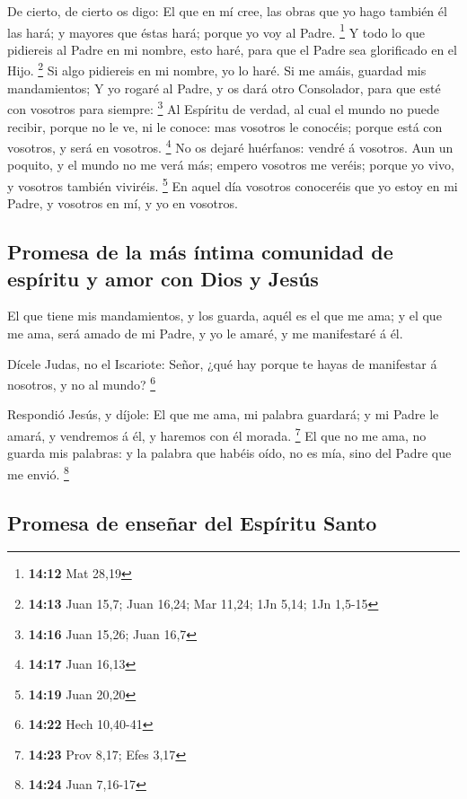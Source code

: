  De cierto, de cierto os digo: El que en mí cree, las obras
que yo hago también él las hará; y mayores que éstas hará; porque yo voy
al Padre. \footnote{\textbf{14:12} Mat 28,19}  Y todo lo
que pidiereis al Padre en mi nombre, esto haré, para que el Padre sea
glorificado en el Hijo. \footnote{\textbf{14:13} Juan 15,7; Juan 16,24;
  Mar 11,24; 1Jn 5,14; 1Jn 1,5-15}  Si algo pidiereis en mi
nombre, yo lo haré.  Si me amáis, guardad mis mandamientos;
 Y yo rogaré al Padre, y os dará otro Consolador, para que
esté con vosotros para siempre: \footnote{\textbf{14:16} Juan 15,26;
  Juan 16,7}  Al Espíritu de verdad, al cual el mundo no
puede recibir, porque no le ve, ni le conoce: mas vosotros le conocéis;
porque está con vosotros, y será en vosotros. \footnote{\textbf{14:17}
  Juan 16,13}  No os dejaré huérfanos: vendré á vosotros.
 Aun un poquito, y el mundo no me verá más; empero vosotros
me veréis; porque yo vivo, y vosotros también viviréis. \footnote{\textbf{14:19}
  Juan 20,20}  En aquel día vosotros conoceréis que yo
estoy en mi Padre, y vosotros en mí, y yo en vosotros.

\hypertarget{promesa-de-la-muxe1s-uxedntima-comunidad-de-espuxedritu-y-amor-con-dios-y-jesuxfas}{%
\subsection{Promesa de la más íntima comunidad de espíritu y amor con
Dios y
Jesús}\label{promesa-de-la-muxe1s-uxedntima-comunidad-de-espuxedritu-y-amor-con-dios-y-jesuxfas}}

 El que tiene mis mandamientos, y los guarda, aquél es el
que me ama; y el que me ama, será amado de mi Padre, y yo le amaré, y me
manifestaré á él.

 Dícele Judas, no el Iscariote: Señor, ¿qué hay porque te
hayas de manifestar á nosotros, y no al mundo? \footnote{\textbf{14:22}
  Hech 10,40-41}

 Respondió Jesús, y díjole: El que me ama, mi palabra
guardará; y mi Padre le amará, y vendremos á él, y haremos con él
morada. \footnote{\textbf{14:23} Prov 8,17; Efes 3,17}  El
que no me ama, no guarda mis palabras: y la palabra que habéis oído, no
es mía, sino del Padre que me envió. \footnote{\textbf{14:24} Juan
  7,16-17}

\hypertarget{promesa-de-enseuxf1ar-del-espuxedritu-santo}{%
\subsection{Promesa de enseñar del Espíritu
Santo}\label{promesa-de-enseuxf1ar-del-espuxedritu-santo}}

